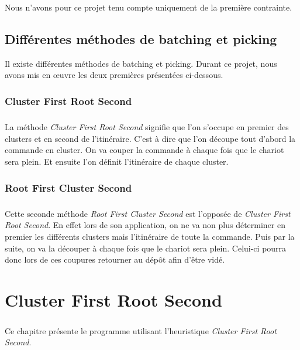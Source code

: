 \documentclass[twoside,UTF8]{EPURapport}
\begin{document}
Nous n'avons pour ce projet tenu compte uniquement de la première contrainte.

\section{Différentes méthodes de batching et picking}

Il existe différentes méthodes de batching et picking. Durant ce projet, nous avons mis en œuvre les deux premières présentées ci-dessous.

\subsection{Cluster First Root Second}
\label{sec:CFRS}

\paragraph{}La méthode \textit{Cluster First Root Second} signifie que l'on s'occupe en premier des clusters et en second de l'itinéraire. C'est à dire que l'on découpe tout d'abord la commande en cluster. On va couper la commande à chaque fois que le chariot sera plein. Et ensuite l'on définit l'itinéraire de chaque cluster. 

\subsection{Root First Cluster Second}
\label{sec:RFCS}
\paragraph{}Cette seconde méthode \textit{Root First Cluster Second} est l'opposée de \textit{Cluster First Root Second}. En effet lors de son application, on ne va non plus déterminer en premier les différents clusters mais l'itinéraire de toute la commande. Puis par la suite, on va la découper à chaque fois que le chariot sera plein. Celui-ci pourra donc lors de ces coupures retourner au dépôt afin d'être vidé.





\chapter{Cluster First Root Second}

\paragraph{} Ce chapitre présente le programme utilisant l'heuristique \textit{Cluster First Root Second}. 
\end{document}
